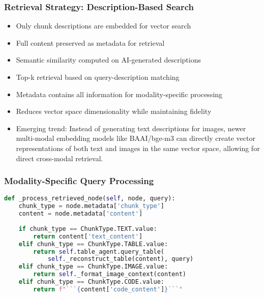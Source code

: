 \begin{frame}[fragile]\frametitle{Retrieval Strategy: Description-Based Search}
\begin{itemize}
\item Only chunk descriptions are embedded for vector search
\item Full content preserved as metadata for retrieval
\item Semantic similarity computed on AI-generated descriptions
\item Top-k retrieval based on query-description matching
\item Metadata contains all information for modality-specific processing
\item Reduces vector space dimensionality while maintaining fidelity
\item Emerging trend: Instead of generating text descriptions for images, newer multi-modal embedding models like BAAI/bge-m3 can directly create vector representations of both text and images in the same vector space, allowing for direct cross-modal retrieval.
\end{itemize}
\end{frame}

\begin{frame}[fragile]\frametitle{Modality-Specific Query Processing}
\begin{lstlisting}[language=Python, basicstyle=\tiny]
def _process_retrieved_node(self, node, query):
    chunk_type = node.metadata['chunk_type']
    content = node.metadata['content']
    
    if chunk_type == ChunkType.TEXT.value:
        return content['text_content']
    elif chunk_type == ChunkType.TABLE.value:
        return self.table_agent.query_table(
            self._reconstruct_table(content), query)
    elif chunk_type == ChunkType.IMAGE.value:
        return self._format_image_context(content)
    elif chunk_type == ChunkType.CODE.value:
        return f"```{content['code_content']}```"
\end{lstlisting}
\end{frame}

